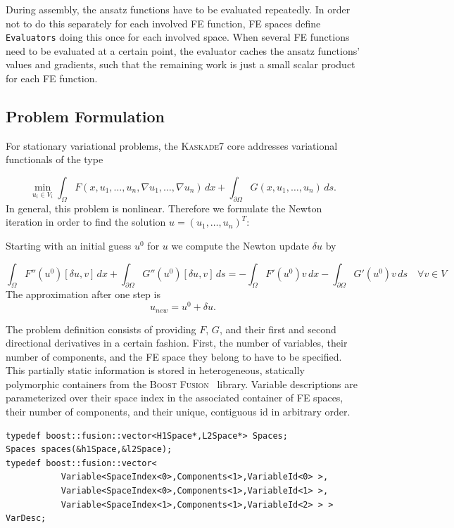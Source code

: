\documentclass[11pt]{article}
\newcommand{\K}{\textsc{Kaskade7 }}
\begin{document}
During assembly, the ansatz functions have to be evaluated repeatedly. In order not to do this separately for each involved FE function, FE spaces define {\tt Evaluators} doing this once for each involved space. When several FE functions need to be evaluated at a certain point, the evaluator caches the ansatz functions' values and gradients, such that the remaining work is just a small scalar product for each FE function.

\subsection{Problem Formulation} \label{problemDef}
For stationary variational problems, the \K core addresses variational functionals of the type

\begin{equation}\label{basicvariational}
  \min_{u_i\in V_i} \int_{\Omega} F(x,u_1,\dots,u_n,\nabla u_1,\dots,\nabla u_n) \, dx + \int_{\partial \Omega} G(x,u_1,\dots,u_n) \,ds.
\end{equation}
In general, this problem is nonlinear. Therefore we formulate the Newton iteration in order to find the solution $u = (u_1, \dots, u_n)^T$:

Starting with an initial guess $u^0$ for $u$ we compute the Newton update  $\delta u$ by

\begin{equation}\label{newtonUpdate}
  \int_{\Omega} F''(u^0)[\delta u,v] \, dx + \int_{\partial \Omega} G''(u^0)[\delta u,v] \, ds = 
  -\int_{\Omega} F'(u^0) v \,dx - \int_{\partial \Omega} G'(u^0) v \,ds \quad \forall v \in V
\end{equation}
The approximation after one step is
\[
u_{new} = u^0 + \delta u.
\]


\noindent The problem definition consists of providing $F$, $G$, and their first and second directional derivatives in a certain 
fashion. First, the number of variables, their number of components, and the FE space they belong to have to be specified. 
This partially static information is stored in heterogeneous, statically polymorphic containers from 
the \textsc{Boost Fusion}~\cite{boost} library. Variable descriptions are parameterized over 
their space index in the associated container of FE spaces, their number of components, and their unique, contiguous id in arbitrary order.

\begin{lstlisting}
typedef boost::fusion::vector<H1Space*,L2Space*> Spaces;
Spaces spaces(&h1Space,&l2Space);
typedef boost::fusion::vector<
           Variable<SpaceIndex<0>,Components<1>,VariableId<0> >, 
           Variable<SpaceIndex<0>,Components<1>,VariableId<1> >, 
           Variable<SpaceIndex<1>,Components<1>,VariableId<2> > > VarDesc;
\end{lstlisting}
\end{document}
